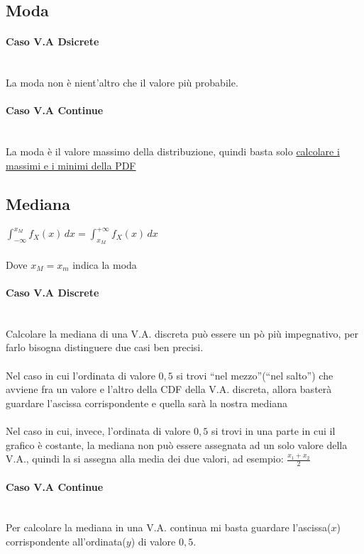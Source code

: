 \documentclass{article}
\begin{document}
\subsection{Moda}
\paragraph{Caso V.A Dsicrete} ~\\
La moda non è nient'altro che il valore più probabile.

\paragraph{Caso V.A Continue} ~\\
La moda è il valore massimo della distribuzione, quindi basta solo \href{https://www.youmath.it/lezioni/analisi-matematica/derivate/401-massimi-e-minimi-di-una-funzione.html}{calcolare i massimi e i minimi della PDF}

\subsection{Mediana}
$\int_{-\infty}^{x_M} f_X(x) \,dx = \int_{x_M}^{+\infty} f_X(x) \,dx$ \\
\\
Dove $x_M = x_m $ indica la moda
\paragraph{Caso V.A Discrete} ~\\
Calcolare la mediana di una V.A. discreta può essere un pò più impegnativo, per farlo bisogna distinguere due casi ben precisi.\\
\\
Nel caso in cui l’ordinata di valore $0,5$ si trovi “nel mezzo”(“nel salto”) che avviene fra un valore e l’altro della CDF della V.A. discreta, allora basterà guardare l’ascissa corrispondente e quella sarà la nostra mediana \\
\\
Nel caso in cui, invece, l’ordinata di valore $0,5$ si trovi in una parte in cui il grafico è costante, la mediana non può essere assegnata ad un solo valore della V.A., quindi la si assegna alla media dei due valori, ad esempio: $\frac{x_1 + x_2}{2}$

\paragraph{Caso V.A Continue} ~\\
Per calcolare la mediana in una V.A. continua mi basta guardare l’ascissa($x$) corrispondente all’ordinata($y$) di valore $0,5$.
\end{document}
